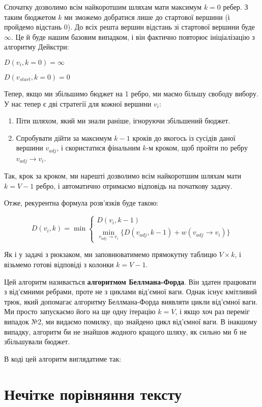 \documentclass[12pt,a4paper]{report}
\begin{document}
Спочатку дозволимо всім найкоротшим шляхам мати максимум \(k = 0\) ребер. З таким бюджетом \(k\) ми зможемо добратися лише до стартової вершини (і пройдемо відстань 0). До всіх решта вершин відстань зі стартової вершини буде \(\infty\). Це й буде нашим базовим випадком, і він фактично повторює ініціалізацію з алгоритму Дейкстри:

\begin{center}
    \(D(v_{i}, k = 0) = \infty\)

    \(D(v_{start}, k = 0) = 0\)
\end{center}

Тепер, якщо ми збільшимо бюджет на 1 ребро, ми маємо більшу свободу вибору. У нас тепер є дві стратегії для кожної вершини \(v_i\):

\begin{enumerate}
    \item Піти шляхом, який ми знали раніше, ігноруючи збільшений бюджет.
    \item Спробувати дійти за максимум \(k - 1\) кроків до якогось із сусідів даної вершини \(v_{adj}\), і скористатися фінальним \(k\)-м кроком, щоб пройти по ребру \(v_{adj} \rightarrow v_i\).
\end{enumerate}

Так, крок за кроком, ми нарешті дозволимо всім найкоротшим шляхам мати \(k = V - 1\) ребро, і автоматично отримаємо відповідь на початкову задачу.

Отже, рекурентна формула розв’язків буде такою:

\begin{center}
    \begin{equation*}
        D(v_i, k) = \min
        \begin{cases}
            D(v_i, k - 1) \\
            \min\limits_{v_{adj} \rightarrow v_i} \{ D(v_{adj}, k - 1) + w(v_{adj} \rightarrow v_i) \}
        \end{cases}
    \end{equation*}
\end{center}

Як і у задачі з рюкзаком, ми заповнюватимемо прямокутну таблицю \(V \times k\), і візьмемо готові відповіді з колонки \(k = V - 1\).

Цей алгоритм називається \textbf{алгоритмом Беллмана-Форда}. Він здатен працювати з від’ємними ребрами, проте не з циклами від’ємної ваги. Однак існує кмітливий трюк, який допомагає алгоритму Беллмана-Форда виявляти цикли від’ємної ваги. Ми просто запускаємо його на ще одну ітерацію \(k = V\), і якщо хоч раз переміг випадок №2, ми видаємо помилку, що знайдено цикл від’ємної ваги. В інакшому випадку, алгоритм би не знайшов жодного кращого шляху, як сильно ми б не збільшували бюджет.

В коді цей алгоритм виглядатиме так:





\section{Нечітке порівняння тексту}
\end{document}
